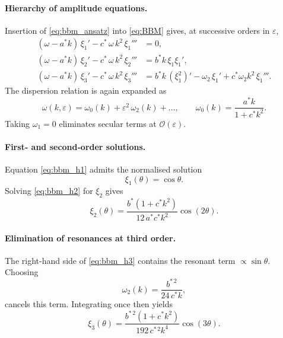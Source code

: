 \documentclass[alpha-refs, 12pt]{wiley-article}
\renewcommand{\O}{\mathcal{O}}
\newcommand{\eps}{\varepsilon}
\begin{document}
\paragraph{Hierarchy of amplitude equations.} Insertion of \eqref{eq:bbm_ansatz} into \eqref{eq:BBM} gives, at successive orders in $\eps$,
\begin{align}
  (\omega-a^{\ast}k)\,\xi_{1}'-c^{\ast}\,\omega\,k^{2}\,\xi_{1}''' &=0,\label{eq:bbm_h1}\\
  (\omega-a^{\ast}k)\,\xi_{2}'-c^{\ast}\,\omega\,k^{2}\,\xi_{2}''' &=b^{\ast}k\,\xi_{1}\xi_{1}',\label{eq:bbm_h2}\\
  (\omega-a^{\ast}k)\,\xi_{3}'-c^{\ast}\,\omega\,k^{2}\,\xi_{3}''' &=b^{\ast}k\,(\xi_{1}^{2})'
          -\omega_{2}\,\xi_{1}'
          +c^{\ast}\omega_{2}k^{2}\,\xi_{1}'''.\label{eq:bbm_h3}
\end{align}
The dispersion relation is again expanded as
\[
  \omega(k,\eps)
  =\omega_{0}(k)+\eps^{2}\,\omega_{2}(k)+\dots,
  \qquad
  \omega_{0}(k)=\frac{a^{\ast}k}{1+c^{\ast}k^{2}}.
\]
Taking $\omega_{1}=0$ eliminates secular terms at $\O(\eps)$.

\paragraph{First‐ and second‐order solutions.} Equation \eqref{eq:bbm_h1} admits the normalised solution
\[
  \xi_{1}(\theta)=\cos\theta.
\]
Solving \eqref{eq:bbm_h2} for $\xi_{2}$ gives
\begin{equation}\label{eq:bbm_xi2}
  \xi_{2}(\theta)
  =\frac{b^{\ast}(1+c^{\ast}k^{2})}{12\,a^{\ast}c^{\ast}k^{2}}
   \cos(2\theta).
\end{equation}

\paragraph{Elimination of resonances at third order.} The right-hand side of \eqref{eq:bbm_h3} contains the resonant term
\(
  \propto\sin\theta.
\)
Choosing
\begin{equation}\label{eq:bbm_omega2}
  \omega_{2}(k)=\frac{b^{\ast\,2}}{24\,c^{\ast}k},
\end{equation}
cancels this term. Integrating once then yields
\begin{equation}\label{eq:bbm_xi3}
  \xi_{3}(\theta)
  =\frac{b^{\ast\,2}(1+c^{\ast}k^{2})}{192\,c^{\ast\,2}k^{4}}
   \cos(3\theta).
\end{equation}
\end{document}
